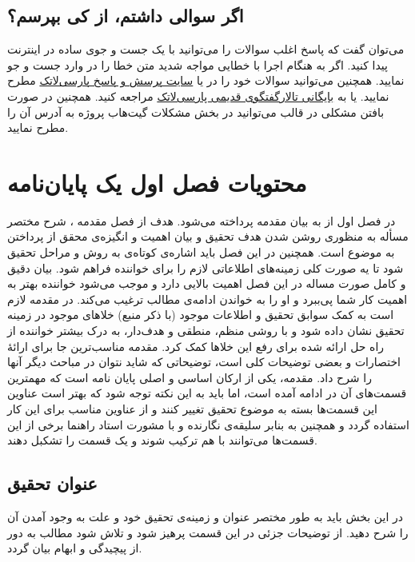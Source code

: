 \subsection{اگر سوالی داشتم، از کی بپرسم؟}
می‌توان گفت که پاسخ اغلب سوالات را می‌توانید با یک جست و جوی ساده در اینترنت پیدا کنید. اگر به هنگام اجرا با خطایی مواجه شدید متن خطا را در 
وارد جست و جو نمایید. همچنین می‌توانید سوالات خود را در 
یا
\href{http://qa.parsilatex.com}{سایت پرسش و پاسخ پارسی‌لاتک}%
مطرح نمایید.
یا به
\href{http://forum.parsilatex.com}{بایگانی تالارگفتگوی قدیمی پارسی‌لاتک}%
مراجعه کنید.
همچنین در صورت بافتن مشکلی در قالب می‌توانید در بخش مشکلات گیت‌هاب پروژه به آدرس 
آن را مطرح نمایید.

\section{محتویات فصل اول یک پایان‌نامه}
در فصل اول از \پ به بیان مقدمه پرداخته می‌شود.
هدف از فصل مقدمه%
،
شرح مختصر مسأله به منظوری روشن شدن هدف تحقیق و بیان اهمیت و انگیزه‌ی محقق از پرداختن به موضوع \پ است. همچنین در این فصل باید اشاره‌ی کوتاه‌ی به روش و مراحل تحقیق شود تا یه صورت کلی زمینه‌های اطلاعاتی لازم را برای خواننده فراهم شود. بیان دقیق و کامل صورت مساله در این فصل اهمیت بالایی دارد و موجب می‌شود خواننده بهتر به اهمیت کار شما پی‌ببرد و او را به خواندن ادامه‌ی مطالب ترغیب می‌کند. در مقدمه لازم است به کمک سوابق تحقیق و اطلاعات موجود (با ذکر منبع) خلاهای موجود در زمینه تحقیق نشان داده شود و با روشی منظم، منطقی و هدف‌دار،  به درک بیشتر خواننده از راه حل ارائه شده برای رفع این خلاها کمک کرد. مقدمه مناسب‌ترین جا برای ارائهٔ اختصارات و بعضی توضیحات کلی است، توضیحاتی که شاید نتوان در مباحث دیگر آنها را شرح داد. 
مقدمه، یکی از ارکان اساسی و اصلی پایان نامه است که مهمترین قسمت‌های آن در ادامه آمده است، اما باید به این نکته توجه شود که بهتر است عناوین این قسمت‌ها بسته به موضوع تحقیق  تغییر کنند و از عناوین مناسب برای این کار استفاده گردد و همچنین به بنابر سلیقه‌ی نگارنده و با مشورت استاد راهنما برخی از این قسمت‌ها می‌توانند با هم ترکیب شوند و یک قسمت را تشکبل دهند.

\subsection{عنوان تحقیق} 
در این بخش باید به طور مختصر عنوان و زمینه‌ی تحقیق خود و علت به وجود آمدن آن را شرح دهید.
از توضیحات جزئی در این قسمت پرهیز شود و تلاش شود مطالب به دور از پیچیدگی و ابهام بیان گردد.
